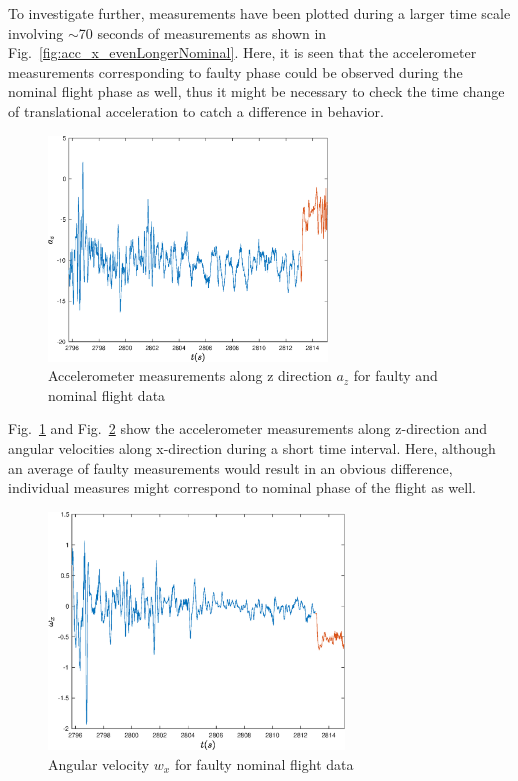 To investigate further, measurements have been plotted during a larger time scale involving $\sim$70 seconds of measurements as shown in Fig.~\ref{fig:acc_x_evenLongerNominal}. 
Here, it is seen that the accelerometer measurements corresponding to faulty phase could be observed during the nominal flight phase as well, thus it might be necessary to check the time change of translational acceleration to catch a difference in behavior. 

\begin{figure}[!h]
\begin{center}
\includegraphics[width=0.66\textwidth]{figures/acc_z}    %
\caption{Accelerometer measurements along z direction $a_z$ for faulty and nominal flight data} 
\label{fig:acc_z}
\end{center}
\end{figure}

Fig.~\ref{fig:acc_z} and Fig.~\ref{fig:gyro_x} show the accelerometer measurements along z-direction and angular velocities along x-direction during a short time interval. 
Here, although an average of faulty measurements would result in an obvious difference, individual measures might correspond to nominal phase of the flight as well.

\begin{figure}[h]
\begin{center}
\includegraphics[width=0.7\textwidth]{figures/gyro_x}    %
\caption{Angular velocity $w_x$  for faulty nominal flight data} 
\label{fig:gyro_x}
\end{center}
\end{figure}


